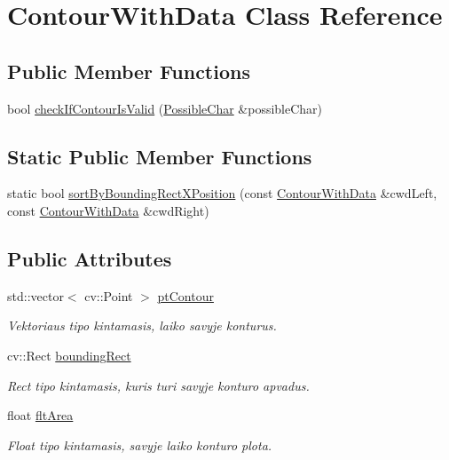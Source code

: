 \hypertarget{class_contour_with_data}{}\section{Contour\+With\+Data Class Reference}
\label{class_contour_with_data}
\subsection*{Public Member Functions}
\begin{DoxyCompactItemize}
\item 
bool \hyperlink{class_contour_with_data_a101e8ba37599c061008c6ab8812a48f8}{check\+If\+Contour\+Is\+Valid} (\hyperlink{class_possible_char}{Possible\+Char} \&possible\+Char)
\end{DoxyCompactItemize}
\subsection*{Static Public Member Functions}
\begin{DoxyCompactItemize}
\item 
static bool \hyperlink{class_contour_with_data_a467efdd6adb42badb28de1398b269d1f}{sort\+By\+Bounding\+Rect\+X\+Position} (const \hyperlink{class_contour_with_data}{Contour\+With\+Data} \&cwd\+Left, const \hyperlink{class_contour_with_data}{Contour\+With\+Data} \&cwd\+Right)
\end{DoxyCompactItemize}
\subsection*{Public Attributes}
\begin{DoxyCompactItemize}
\item 
std\+::vector$<$ cv\+::\+Point $>$ \hyperlink{class_contour_with_data_a28f63c52d8383623adc00e4481e6b9aa}{pt\+Contour}
\begin{DoxyCompactList}\small\item\em Vektoriaus tipo kintamasis, laiko savyje konturus. \end{DoxyCompactList}\item 
cv\+::\+Rect \hyperlink{class_contour_with_data_ab2bebe42d7353d50fe515bd25c561247}{bounding\+Rect}
\begin{DoxyCompactList}\small\item\em Rect tipo kintamasis, kuris turi savyje konturo apvadus. \end{DoxyCompactList}\item 
float \hyperlink{class_contour_with_data_a640536a3a32dd02f85e6a5f70ddfe7e3}{flt\+Area}
\begin{DoxyCompactList}\small\item\em Float tipo kintamasis, savyje laiko konturo plota. \end{DoxyCompactList}\end{DoxyCompactItemize}



